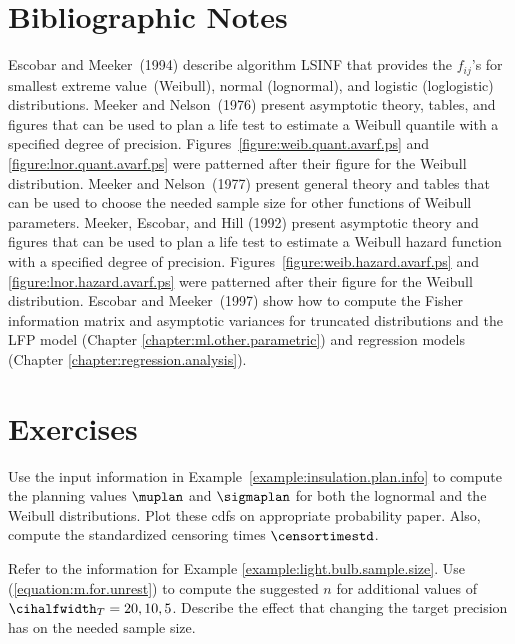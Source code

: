 

\section*{Bibliographic Notes}

Escobar and Meeker~(1994) describe algorithm LSINF that provides the
$f_{ij}$'s for smallest extreme value~(Weibull), normal (lognormal),
and logistic (loglogistic) distributions.  Meeker and Nelson~(1976)
present asymptotic theory, tables, and figures that can be used to
plan a life test to estimate a Weibull quantile with a specified
degree of precision. Figures~\ref{figure:weib.quant.avarf.ps} and
\ref{figure:lnor.quant.avarf.ps} were patterned after their figure
for the Weibull distribution. Meeker and Nelson~(1977) present general
theory and tables that can be used to choose the needed sample size
for other functions of Weibull parameters.  Meeker, Escobar, and Hill
(1992) present asymptotic theory and figures that can be used to plan
a life test to estimate a Weibull hazard function with a specified
degree of precision. Figures~\ref{figure:weib.hazard.avarf.ps} and
\ref{figure:lnor.hazard.avarf.ps} were patterned after their
figure for the Weibull distribution.  Escobar and Meeker~(1997) show
how to compute the Fisher information matrix and asymptotic
variances for truncated distributions and the LFP model (Chapter
\ref{chapter:ml.other.parametric}) and regression models (Chapter
\ref{chapter:regression.analysis}).
\section*{Exercises}

\begin{exercise}
Use the input information in
Example~\ref{example:insulation.plan.info} to compute the planning
values $\muplan$ and $\sigmaplan$ for both the lognormal and the
Weibull distributions. Plot these cdfs on appropriate probability
paper.  Also, compute the standardized censoring times
$\censortimestd$.
\end{exercise}
\begin{exercise}
Refer to the information for Example
\ref{example:light.bulb.sample.size}.  Use
(\ref{equation:m.for.unrest}) to compute the suggested $n$ for
additional values of $\cihalfwidth_{T}=20,10,5$. Describe the effect
that changing the target precision has on the needed sample size.
\end{exercise}


